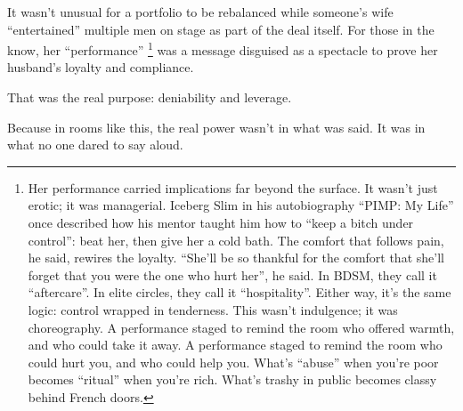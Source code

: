 \medskip

It wasn’t unusual for a portfolio to be rebalanced while someone’s wife “entertained” multiple men on stage as part of 
the deal itself. For those in the know, her ``performance'' 
\footnote{Her performance carried implications far beyond the surface. It wasn’t just erotic; it was managerial.
Iceberg Slim in his autobiography ``PIMP: My Life'' once described how his mentor taught him how to ``keep a bitch under 
control'': beat her, then give her a cold bath. The comfort
that follows pain, he said, rewires the loyalty. ``She'll be so thankful for the comfort that she'll forget that you were 
the one who hurt her'', he said. In BDSM, they call it ``aftercare''.
In elite circles, they call it ``hospitality''. Either way, it’s the same logic: control wrapped in tenderness.
This wasn’t indulgence; it was choreography. A performance staged to remind the room who offered warmth,
and who could take it away. A performance staged to remind the room who could hurt you, and who could help you.
What’s ``abuse'' when you’re poor becomes ``ritual'' when you’re rich.
What’s trashy in public becomes classy behind French doors.}
was a message disguised as a spectacle to prove her husband's loyalty and compliance.

That was the real purpose: deniability and leverage.

Because in rooms like this, the real power wasn’t in what was said.  It was in what no one dared to say aloud.

\medskip

